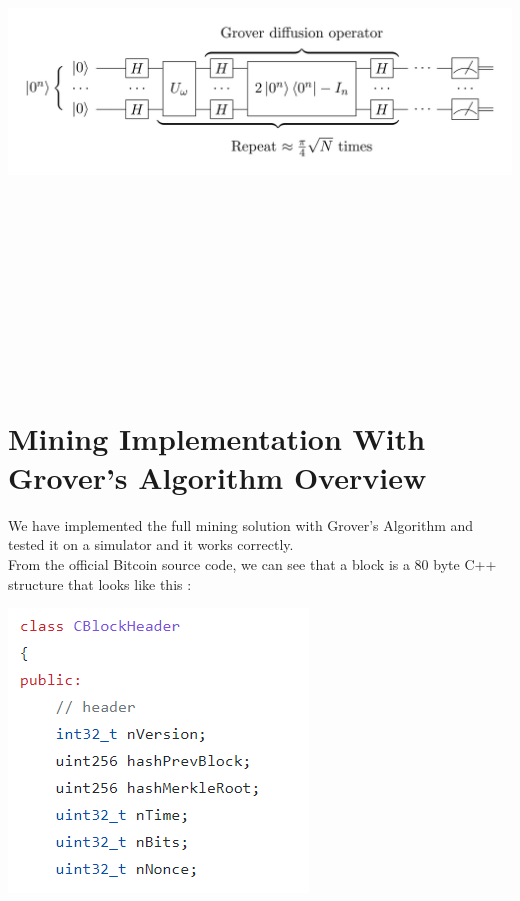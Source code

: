 \documentclass[11pt]{article} %
\begin{document}
\noindent \includegraphics[keepaspectratio, width=15cm, height=15cm]{grover-circuit}

\section{Mining Implementation With Grover's Algorithm Overview}{}
We have implemented the full mining solution with Grover's Algorithm and tested it on a simulator and it works correctly. \\

\noindent From the official Bitcoin source code, we can see that a block is a 80 byte C++ structure that looks like this \cite{3}:

\includegraphics{block}
\end{document}
